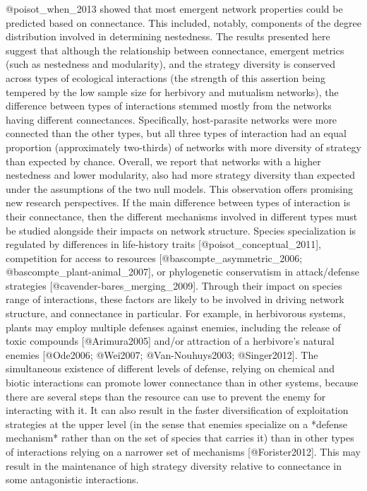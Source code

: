 @poisot_when_2013 showed that most emergent network properties could be
predicted based on connectance. This included, notably, components of the
degree distribution involved in determining nestedness. The results presented
here suggest that although the relationship between connectance, emergent
metrics (such as nestedness and modularity), and the strategy diversity
is conserved across types of ecological interactions (the strength of this
assertion being tempered by the low sample size for herbivory and mutualism
networks), the difference between types of interactions stemmed mostly from
the networks having different connectances. Specifically, host-parasite
networks were more connected than the other types, but all three types of
interaction had an equal proportion (approximately two-thirds) of networks
with more diversity of strategy than expected by chance. Overall, we report
that networks with a higher nestedness and lower modularity, also had more
strategy diversity than expected under the assumptions of the two null
models. This observation offers promising new research perspectives. If
the main difference between types of interaction is their connectance,
then the different mechanisms involved in different types must be studied
alongside their impacts on network structure. Species specialization is
regulated by differences in life-history traits [@poisot_conceptual_2011],
competition for access to resources [@bascompte_asymmetric_2006;
@bascompte_plant-animal_2007], or phylogenetic conservatism in attack/defense
strategies [@cavender-bares_merging_2009]. Through their impact on species
range of interactions, these factors are likely to be involved in driving
network structure, and connectance in particular. For example, in herbivorous
systems, plants may employ multiple defenses against enemies, including the
release of toxic compounds [@Arimura2005] and/or attraction of a herbivore’s
natural enemies [@Ode2006; @Wei2007; @Van-Nouhuys2003; @Singer2012]. The
simultaneous existence of different levels of defense, relying on chemical
and biotic interactions can promote lower connectance than in other systems,
because there are several steps than the resource can use to prevent the enemy
for interacting with it. It can also result in the faster diversification
of exploitation strategies at the upper level (in the sense that enemies
specialize on a *defense mechanism* rather than on the set of species that
carries it) than in other types of interactions relying on a narrower set
of mechanisms [@Forister2012]. This may result in the maintenance of high
strategy diversity relative to connectance in some antagonistic interactions.
